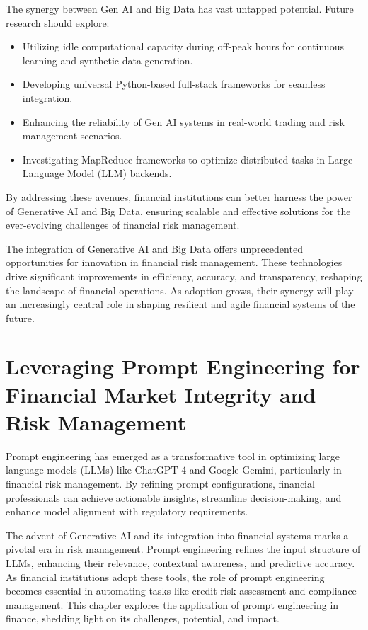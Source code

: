 \documentclass[a4paper,12pt]{scrbook}
\begin{document}
	The synergy between Gen AI and Big Data has vast untapped potential. Future research should explore:
	\begin{itemize}
		\item Utilizing idle computational capacity during off-peak hours for continuous learning and synthetic data generation.
		\item Developing universal Python-based full-stack frameworks for seamless integration.
		\item Enhancing the reliability of Gen AI systems in real-world trading and risk management scenarios.
		\item Investigating MapReduce frameworks to optimize distributed tasks in Large Language Model (LLM) backends.
	\end{itemize}
	
	By addressing these avenues, financial institutions can better harness the power of Generative AI and Big Data, ensuring scalable and effective solutions for the ever-evolving challenges of financial risk management.
	
	The integration of Generative AI and Big Data offers unprecedented opportunities for innovation in financial risk management. These technologies drive significant improvements in efficiency, accuracy, and transparency, reshaping the landscape of financial operations. As adoption grows, their synergy will play an increasingly central role in shaping resilient and agile financial systems of the future.
	
	\chapter{Leveraging Prompt Engineering for Financial Market Integrity and Risk Management}
	
	Prompt engineering has emerged as a transformative tool in optimizing large language models (LLMs) like ChatGPT-4 and Google Gemini, particularly in financial risk management. By refining prompt configurations, financial professionals can achieve actionable insights, streamline decision-making, and enhance model alignment with regulatory requirements.
	
	The advent of Generative AI and its integration into financial systems marks a pivotal era in risk management. Prompt engineering refines the input structure of LLMs, enhancing their relevance, contextual awareness, and predictive accuracy. As financial institutions adopt these tools, the role of prompt engineering becomes essential in automating tasks like credit risk assessment and compliance management. This chapter explores the application of prompt engineering in finance, shedding light on its challenges, potential, and impact.
	
\end{document}
